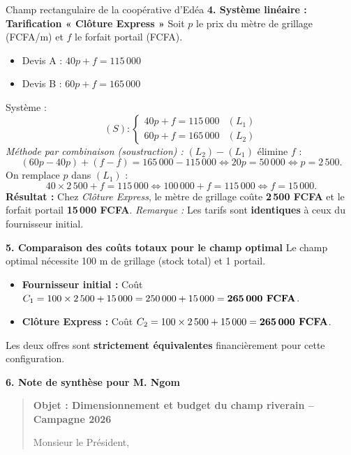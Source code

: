 \documentclass[11pt]{article}
\begin{document}
\begin{exoresolu}{Champ rectangulaire de la coopérative d'Edéa}
\textbf{4. Système linéaire : Tarification « Clôture Express »}
Soit $p$ le prix du mètre de grillage (FCFA/m) et $f$ le forfait portail (FCFA).
\begin{itemize}
    \item Devis A : $40p + f = 115\,000$
    \item Devis B : $60p + f = 165\,000$
\end{itemize}
Système :
\[
(S) : \begin{cases}
40p + f = 115\,000 & (L_1)\\
60p + f = 165\,000 & (L_2)
\end{cases}
\]
\emph{Méthode par combinaison (soustraction) :} $(L_2) - (L_1)$ élimine $f$ :
\[
(60p - 40p) + (f - f) = 165\,000 - 115\,000 \iff 20p = 50\,000 \iff p = 2\,500.
\]
On remplace $p$ dans $(L_1)$ :
\[
40 \times 2\,500 + f = 115\,000 \iff 100\,000 + f = 115\,000 \iff f = 15\,000.
\]
\textbf{Résultat :} Chez \textit{Clôture Express}, le mètre de grillage coûte \textbf{2\,500 FCFA} et le forfait portail \textbf{15\,000 FCFA}.
\emph{Remarque :} Les tarifs sont \textbf{identiques} à ceux du fournisseur initial.

\textbf{5. Comparaison des coûts totaux pour le champ optimal}
Le champ optimal nécessite 100 m de grillage (stock total) et 1 portail.
\begin{itemize}
    \item \textbf{Fournisseur initial :} Coût $C_1 = 100 \times 2\,500 + 15\,000 = 250\,000 + 15\,000 = \textbf{265\,000 FCFA}$.
    \item \textbf{Clôture Express :} Coût $C_2 = 100 \times 2\,500 + 15\,000 = \textbf{265\,000 FCFA}$.
\end{itemize}
Les deux offres sont \textbf{strictement équivalentes} financièrement pour cette configuration.

\textbf{6. Note de synthèse pour M. Ngom}
\begin{quote}
\textbf{Objet : Dimensionnement et budget du champ riverain – Campagne 2026}

Monsieur le Président,


\end{quote}
\end{exoresolu}
\end{document}
